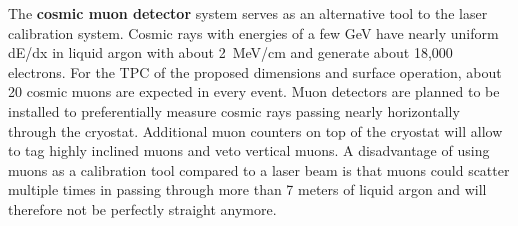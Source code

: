 The {\bf cosmic muon detector} system serves as an alternative tool to the laser calibration system. Cosmic rays with energies of a few GeV 
have nearly uniform dE/dx in liquid argon with about 2~MeV/cm and generate about 18,000 electrons. %
For the TPC of the proposed dimensions and surface operation, about 20 cosmic muons are expected in every event. 
Muon detectors are planned to be installed to preferentially measure cosmic rays passing nearly horizontally through the cryostat.
Additional muon counters on top of the cryostat will allow to tag highly inclined muons and veto vertical muons. 
  A disadvantage of using muons as a calibration tool compared to a laser beam is that muons could scatter multiple times in passing 
  through more than 7 meters of liquid argon and will therefore not be perfectly straight anymore.
  
